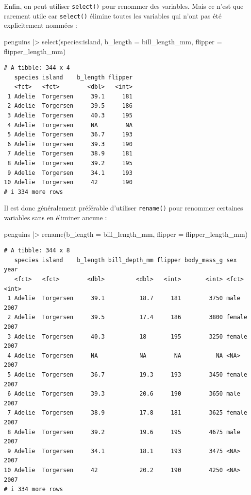 \documentclass[
  a4paper,
  DIV=11,
  numbers=noendperiod,
  oneside]{scrreprt}
\newenvironment{Shaded}{}{}
\newcommand{\AttributeTok}[1]{\textcolor[rgb]{0.84,0.23,0.29}{#1}}
\newcommand{\FunctionTok}[1]{\textcolor[rgb]{0.44,0.26,0.76}{#1}}
\newcommand{\NormalTok}[1]{\textcolor[rgb]{0.14,0.16,0.18}{#1}}
\newcommand{\SpecialCharTok}[1]{\textcolor[rgb]{0.00,0.36,0.77}{#1}}
\begin{document}
Enfin, on peut utiliser \texttt{select()} pour renommer des variables.
Mais ce n'est que rarement utile car \texttt{select()} élimine toutes
les variables qui n'ont pas été explicitement nommées :

\begin{Shaded}
\begin{Highlighting}[]
\NormalTok{penguins }\SpecialCharTok{|\textgreater{}}
  \FunctionTok{select}\NormalTok{(species}\SpecialCharTok{:}\NormalTok{island,}
         \AttributeTok{b\_length =}\NormalTok{ bill\_length\_mm,}
         \AttributeTok{flipper =}\NormalTok{ flipper\_length\_mm)}
\end{Highlighting}
\end{Shaded}

\begin{verbatim}
# A tibble: 344 x 4
   species island    b_length flipper
   <fct>   <fct>        <dbl>   <int>
 1 Adelie  Torgersen     39.1     181
 2 Adelie  Torgersen     39.5     186
 3 Adelie  Torgersen     40.3     195
 4 Adelie  Torgersen     NA        NA
 5 Adelie  Torgersen     36.7     193
 6 Adelie  Torgersen     39.3     190
 7 Adelie  Torgersen     38.9     181
 8 Adelie  Torgersen     39.2     195
 9 Adelie  Torgersen     34.1     193
10 Adelie  Torgersen     42       190
# i 334 more rows
\end{verbatim}

Il est donc généralement préférable d'utiliser \texttt{rename()} pour
renommer certaines variables sans en éliminer aucune :

\begin{Shaded}
\begin{Highlighting}[]
\NormalTok{penguins }\SpecialCharTok{|\textgreater{}}
  \FunctionTok{rename}\NormalTok{(}\AttributeTok{b\_length =}\NormalTok{ bill\_length\_mm,}
         \AttributeTok{flipper =}\NormalTok{ flipper\_length\_mm)}
\end{Highlighting}
\end{Shaded}

\begin{verbatim}
# A tibble: 344 x 8
   species island    b_length bill_depth_mm flipper body_mass_g sex     year
   <fct>   <fct>        <dbl>         <dbl>   <int>       <int> <fct>  <int>
 1 Adelie  Torgersen     39.1          18.7     181        3750 male    2007
 2 Adelie  Torgersen     39.5          17.4     186        3800 female  2007
 3 Adelie  Torgersen     40.3          18       195        3250 female  2007
 4 Adelie  Torgersen     NA            NA        NA          NA <NA>    2007
 5 Adelie  Torgersen     36.7          19.3     193        3450 female  2007
 6 Adelie  Torgersen     39.3          20.6     190        3650 male    2007
 7 Adelie  Torgersen     38.9          17.8     181        3625 female  2007
 8 Adelie  Torgersen     39.2          19.6     195        4675 male    2007
 9 Adelie  Torgersen     34.1          18.1     193        3475 <NA>    2007
10 Adelie  Torgersen     42            20.2     190        4250 <NA>    2007
# i 334 more rows
\end{verbatim}
\end{document}
